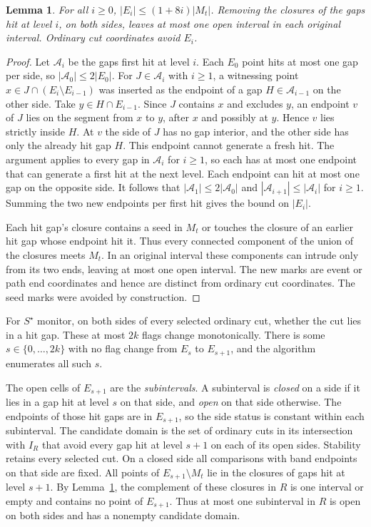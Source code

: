 \documentclass[10pt,letterpaper]{article}
\newtheorem{lemma}{Lemma}
\begin{document}
\begin{lemma}\label{lem:gapmarks}
For all \(i\ge 0\), \(|E_i|\le(1+8i)|M_t|\). Removing the closures of the gaps hit at level \(i\), on both sides, leaves at most one open interval in each original interval. Ordinary cut coordinates avoid \(E_i\).
\end{lemma}
\begin{proof}
Let \(\mathcal A_i\) be the gaps first hit at level \(i\). Each \(E_0\) point hits at most one gap per side, so \(|\mathcal A_0|\le 2|E_0|\). For \(J\in\mathcal A_i\) with \(i\ge 1\), a witnessing point \(x\in J\cap(E_i\setminus E_{i-1})\) was inserted as the endpoint of a gap \(H\in\mathcal A_{i-1}\) on the other side. Take \(y\in H\cap E_{i-1}\). Since \(J\) contains \(x\) and excludes \(y\), an endpoint \(v\) of \(J\) lies on the segment from \(x\) to \(y\), after \(x\) and possibly at \(y\). Hence \(v\) lies strictly inside \(H\). At \(v\) the side of \(J\) has no gap interior, and the other side has only the already hit gap \(H\). This endpoint cannot generate a fresh hit. The argument applies to every gap in \(\mathcal A_i\) for \(i\ge1\), so each has at most one endpoint that can generate a first hit at the next level. Each endpoint can hit at most one gap on the opposite side. It follows that \(|\mathcal A_1|\le 2|\mathcal A_0|\) and \(|\mathcal A_{i+1}|\le|\mathcal A_i|\) for \(i\ge 1\). Summing the two new endpoints per first hit gives the bound on \(|E_i|\).

Each hit gap's closure contains a seed in \(M_t\) or touches the closure of an earlier hit gap whose endpoint hit it. Thus every connected component of the union of the closures meets \(M_t\). In an original interval these components can intrude only from its two ends, leaving at most one open interval. The new marks are event or path end coordinates and hence are distinct from ordinary cut coordinates. The seed marks were avoided by construction.
\end{proof}

For \(S^\star\) monitor, on both sides of every selected ordinary cut, whether the cut lies in a hit gap. These at most \(2k\) flags change monotonically. There is some \(s\in\{0,\ldots,2k\}\) with no flag change from \(E_s\) to \(E_{s+1}\), and the algorithm enumerates all such \(s\).

The open cells of \(E_{s+1}\) are the \emph{subintervals}. A subinterval is \emph{closed} on a side if it lies in a gap hit at level \(s\) on that side, and \emph{open} on that side otherwise. The endpoints of those hit gaps are in \(E_{s+1}\), so the side status is constant within each subinterval. The candidate domain is the set of ordinary cuts in its intersection with \(I_R\) that avoid every gap hit at level \(s+1\) on each of its open sides. Stability retains every selected cut. On a closed side all comparisons with band endpoints on that side are fixed. All points of \(E_{s+1}\setminus M_t\) lie in the closures of gaps hit at level \(s+1\). By Lemma~\ref{lem:gapmarks}, the complement of these closures in \(R\) is one interval or empty and contains no point of \(E_{s+1}\). Thus at most one subinterval in \(R\) is open on both sides and has a nonempty candidate domain.
\end{document}
